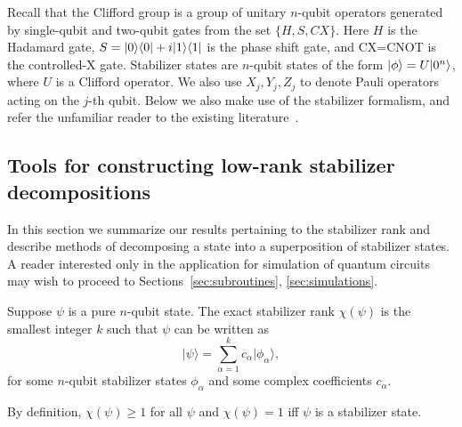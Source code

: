 \label{detailed}
Recall that the Clifford group is a group of unitary $n$-qubit operators
generated by  single-qubit and two-qubit gates
from the set $\{H,S,CX\}$. Here $H$ is the Hadamard gate,
$S=|0\rangle\langle 0|+i|1\rangle\langle 1|$ is the phase shift gate, 
and CX=CNOT is the controlled-X gate.
Stabilizer states are $n$-qubit states of the form $|\phi\rangle=U|0^n\rangle$, where $U$ is a
Clifford operator. We also use $X_j,Y_j,Z_j$ to denote Pauli operators
acting on the $j$-th qubit. Below we also make use of the stabilizer formalism, and refer the unfamiliar reader to the existing literature~\cite{nielsen2002quantum}. 


\subsection{Tools for constructing low-rank stabilizer decompositions}
\label{sec:rank_properties}
In this section we summarize our results pertaining to the stabilizer rank and describe methods of decomposing a state into a superposition of stabilizer states.  A reader interested only in the application for simulation of quantum circuits may wish to proceed to Sections~\ref{sec:subroutines}, \ref{sec:simulations}.

\begin{dfn}
Suppose $\psi$ is a pure $n$-qubit state. 
The  exact stabilizer rank $\chi(\psi)$ is the smallest integer $k$ such that 
$\psi$ can be written as 
	\begin{equation}
	\label{srank1}
	\vert  \psi \rangle  = \sum_{\alpha=1}^{k} c_\alpha \vert \phi_\alpha \rangle	,
	\end{equation}	
for some  $n$-qubit stabilizer states $\phi_\alpha$ and some complex coefficients $c_\alpha$. 
\end{dfn}
\noindent
By definition, $\chi(\psi)\ge 1$ for all $\psi$ and $\chi(\psi)=1$ iff $\psi$ is a stabilizer state.

